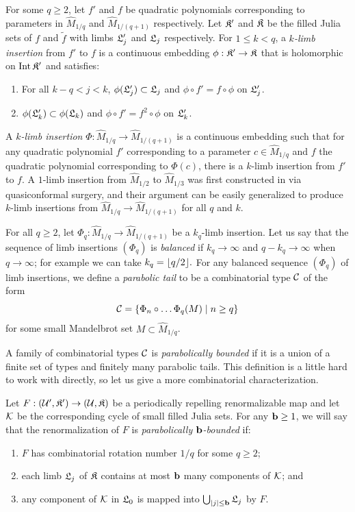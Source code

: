 \documentclass[12pt]{amsart}
\begin{document}
For some $q\geq 2$, let $f'$ and $f$ be quadratic polynomials corresponding to  parameters in $\hat{M}_{1/q}$ and $\hat{M}_{1/(q+1)}$  respectively. Let $\mathfrak{K}'$ and $\mathfrak{K}$ be the filled Julia sets of $f$ and $\tilde f$ with limbs $\mathfrak{L}_j'$ and $\mathfrak{L}_j$ respectively. 
For  $1\leq k< q$, a \textit{$k$-limb insertion}  from $f'$ to $f$ is a continuous embedding 
$\phi: \mathfrak{K}'\to {\mathfrak{K}}$ that is holomorphic on $\operatorname{Int} \mathfrak{K}'$ and satisfies:
\begin{enumerate}
	\item For all $k-q<  j<   k$, $\phi(\mathfrak{L}_j') \subset \mathfrak{L}_j$ and $\phi \circ f' = f\circ \phi$ on $\mathfrak{L}_j'$.
	\item $\phi(\mathfrak{L}_{k}') \subset \phi(\mathfrak{L}_{k})$ and $\phi \circ f' = f^2\circ \phi$ on $\mathfrak{L}_k'$.
\end{enumerate}
A \textit{$k$-limb insertion} 
$\Phi: \hat{M}_{1/q}\to \hat{M}_{1/(q+1)}$
is a continuous embedding 
such that for any quadratic polynomial $f'$ corresponding to a parameter $c\in\hat{M}_{1/q}$ and $f$ the quadratic polynomial corresponding to $\Phi(c)$,  there is a $k$-limb insertion from $f'$ to $f$.
A $1$-limb insertion from $\hat{M}_{1/2}$ to $\hat{M}_{1/3}$ was first  constructed in \cite{BD86} via quasiconformal surgery, and their argument can be easily generalized to produce $k$-limb insertions from $\hat{M}_{1/q}\to \hat{M}_{1/(q+1)}$ for all $q$ and $k$.

For all $q\geq 2$, let $\Phi_{q}: \hat{M}_{1/q}\to \hat{M}_{1/(q+1)}$ be a $k_q$-limb insertion. Let us say that the sequence of limb insertions $(\Phi_q)$ is \textit{balanced} if $k_q\to \infty$ and $q-k_q\to \infty$ when $q\to \infty$; for example we can take $k_q = \lfloor q/2 \rfloor.$ For any balanced sequence $(\Phi_q)$ of limb insertions, we define a \textit{parabolic tail}  to be a combinatorial type $\mathcal C$ of the form
$$\mathcal C = \left\{ \Phi_n\circ \dots \Phi_q(M) \mid n\geq q \right\}$$
for some small Mandelbrot set $M\subset \hat{M}_{1/q}$. 

A family of {combinatorial types} $\mathcal C$ is \textit{parabolically bounded}  if it is a union of a finite set of types and finitely many parabolic tails. This definition is a little hard to work with directly, so let us give a more combinatorial characterization. 

Let $F: (\mathcal U', \mathfrak{K}')\to (\mathcal U, \mathfrak{K})$ be a periodically repelling renormalizable \pql map and let $\mathcal K$ be the corresponding cycle of small filled Julia sets. 
For any $\mathbf b\geq 1$, we will say that the renormalization of $F$  is \textit{parabolically $\mathbf b$-bounded} if:
\begin{enumerate}
	\item $F$ has combinatorial rotation number $1/q$ for some $q\geq 2$; 
	\item each limb $\mathfrak{L}_j$ of $\mathfrak{K}$ contains at most $\mathbf b$ many components of $\mathcal K$; and
	\item any component of $\mathcal K$ in $\mathfrak{L}_0$ is mapped into $\bigcup_{|j|\leq \mathbf b}\mathfrak{L}_j$ by $F$.
\end{enumerate}
\end{document}
